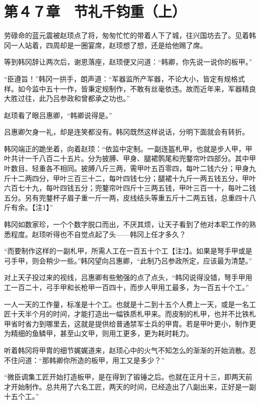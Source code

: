 \section{第４７章　节礼千钧重（上）}

劳碌命的蓝元震被赵顼点了将，匆匆忙忙的带着人下了城，往兴国坊去了。见着韩冈一人站着，四周却是一圈宴席，赵顼想了想，还是给他赐了席。

等到韩冈辞让两次后，谢恩落座，赵顼便又问道：“韩卿，你先说一说你的板甲。”

“臣遵旨！”韩冈一拱手，朗声道：“军器监所产军器，不论大小，皆定有规格式样。如今监中五十一作，皆秉定规制作，不敢有丝毫依违。故而近年来，军器精良大胜过往，此乃吕参政和曾都承之功也。”

赵顼看了眼吕惠卿，“韩卿说得是。”

吕惠卿欠身一礼，却是连笑都没有。韩冈既然这样说话，分明下面就会有转折。

韩冈端正的跪坐着，向着赵顼：“依监中定制。一副连盔札甲，也就是步人甲，甲叶共计一千八百二十五片。分为披膊、甲身、腿裙鹘尾和兜鍪帘叶四部分。其中甲叶数目、轻重各不相同。披膊八斤三两，需甲叶五百零四，每叶二钱六分；甲身九斤十二两四分，甲叶三百三十二，每叶四钱七分；腿裙十九斤一两五钱五分，甲叶六百七十九，每叶四钱五分；兜鍪帘叶四斤十三两五钱，甲叶三百一十，每叶二钱五分。另有兜鍪杯子眉子重一斤一两，皮线结头等重五斤十二两五钱，总重四十八斤有余。【注1】”

韩冈如数家珍，一个个数字脱口而出，不厌其烦，让天子看到了他对本职工作的熟悉程度。赵顼听得也不自觉点起了头——韩冈上任才多久？

“而要制作这样的一副札甲，所需人工在一百五十个工【注2】。如果是弩手甲或是弓手甲，则会稍少一些。”韩冈望向吕惠卿，“此制乃吕参政所定，应该最为清楚。”

对上天子投过来的视线，吕惠卿有些勉强的点了点头，“韩冈说得没错，弩手甲用工一百二十，弓手甲和长枪甲一百四十，而步人甲用工最多，为一百五十个工。”

一人一天的工作量，标准是十个工。也就是十二到十五个人费上一天，或是一名工匠十天半个月的时间，才能打造出一幅铁质札甲来。而皮制的札甲，也并不比铁札甲省时省力到哪里去，这就是提供给普通禁军士兵的甲胄。若是甲叶更小，制作更为精细的鱼鳞甲，甚至山文甲，则用工更多，更为耗时耗力。

听着韩冈将甲胄的细节娓娓道来，赵顼心中的火气不知怎么的渐渐的开始消散。忍不住问道：“那韩卿你所造的板甲，用工又是多少？”

“微臣调集工匠开始打造板甲，是在得到了锻锤之后。也就在正月十三，即两天前才开始制作。总共用了六名工匠，两天的时间，已经造出了八副出来，正好是一副十五个工。”

